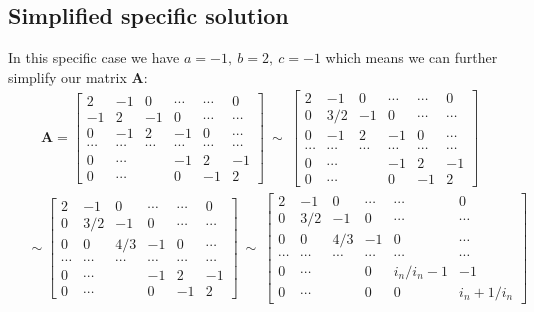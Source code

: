 \documentclass[american,a4paper,12pt]{article}
\renewcommand{\vec}[1]{\mathbf{#1}} %
\begin{document}
\subsection{Simplified specific solution}
In this specific case we have $a = -1,\ b = 2,\ c = -1$ which means we can further simplify our matrix $\vec{A}$:
\begin{align*}
    \vec{A} =
    \begin{bmatrix}
    2 & -1 & 0 & \cdots & \cdots & 0 \\
    -1 & 2 & -1 & 0 & \cdots & \cdots \\
    0 & -1 & 2 & -1 & 0 & \cdots \\
    \cdots & \cdots & \cdots & \cdots & \cdots & \cdots \\
    0 & \cdots & & -1 & 2 & -1 \\
    0 & \cdots & & 0 & -1 & 2
    \end{bmatrix}
    \ \sim \
    \begin{bmatrix}
    2 & -1 & 0 & \cdots & \cdots & 0 \\
    0 & 3/2 & -1 & 0 & \cdots & \cdots \\
    0 & -1 & 2 & -1 & 0 & \cdots \\
    \cdots & \cdots & \cdots & \cdots & \cdots & \cdots \\
    0 & \cdots & & -1 & 2 & -1 \\
    0 & \cdots & & 0 & -1 & 2
    \end{bmatrix}
\end{align*}
\begin{align*}
    \quad \sim
    \begin{bmatrix}
    2 & -1 & 0 & \cdots & \cdots & 0 \\
    0 & 3/2 & -1 & 0 & \cdots & \cdots \\
    0 & 0 & 4/3 & -1 & 0 & \cdots \\
    \cdots & \cdots & \cdots & \cdots & \cdots & \cdots \\
    0 & \cdots & & -1 & 2 & -1 \\
    0 & \cdots & & 0 & -1 & 2
    \end{bmatrix}
    \ \sim \
    \begin{bmatrix}
    2 & -1 & 0 & \cdots & \cdots & 0 \\
    0 & 3/2 & -1 & 0 & \cdots & \cdots \\
    0 & 0 & 4/3 & -1 & 0 & \cdots \\
    \cdots & \cdots & \cdots & \cdots & \cdots & \cdots \\
    0 & \cdots & & 0 & i_n/{i_n-1} & -1 \\
    0 & \cdots & & 0 & 0 & {i_n+1}/i_n
    \end{bmatrix} \\
\end{align*}
\end{document}
